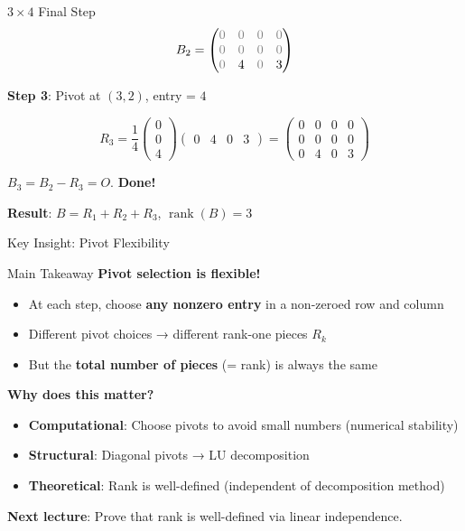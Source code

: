 \documentclass[10pt]{beamer}
\theoremstyle{definition}
\newcommand{\rem}[1]{{\color{gray}#1}}                %
\newcommand{\x}[1]{\alert{\textbf{#1}}}
\begin{document}
\begin{frame}{$3 \times 4$ Final Step}
$$B_2 = \begin{pmatrix}
\rem{0} & \rem{0} & \rem{0} & \rem{0} \\
\rem{0} & \rem{0} & \rem{0} & \rem{0} \\
\rem{0} & 4 & \rem{0} & 3
\end{pmatrix}$$

\vfill
\textbf{Step 3}: Pivot at $(3,2)$, entry = $4$

$$R_3 = \frac{1}{4} \begin{pmatrix} 0 \\ 0 \\ 4 \end{pmatrix}
\begin{pmatrix} 0 & 4 & 0 & 3 \end{pmatrix}
= \begin{pmatrix}
0 & 0 & 0 & 0 \\
0 & 0 & 0 & 0 \\
0 & 4 & 0 & 3
\end{pmatrix}$$

\vfill
$B_3 = B_2 - R_3 = O$. \quad \x{Done!}

\vfill
\textbf{Result}: $B = R_1 + R_2 + R_3$, \quad $\operatorname{rank}(B) = 3$
\end{frame}

\begin{frame}{Key Insight: Pivot Flexibility}
\begin{alertblock}{Main Takeaway}
\textbf{Pivot selection is flexible!}
\begin{itemize}
\item At each step, choose \x{any nonzero entry} in a non-zeroed row and column
\item Different pivot choices → different rank-one pieces $R_k$
\item But the \x{total number of pieces} (= rank) is always the same
\end{itemize}
\end{alertblock}

\vfill
\textbf{Why does this matter?}
\begin{itemize}
\item \textbf{Computational}: Choose pivots to avoid small numbers (numerical stability)
\item \textbf{Structural}: Diagonal pivots → LU decomposition
\item \textbf{Theoretical}: Rank is well-defined (independent of decomposition method)
\end{itemize}

\vfill
\textbf{Next lecture}: Prove that rank is well-defined via linear independence.
\end{frame}
\end{document}
